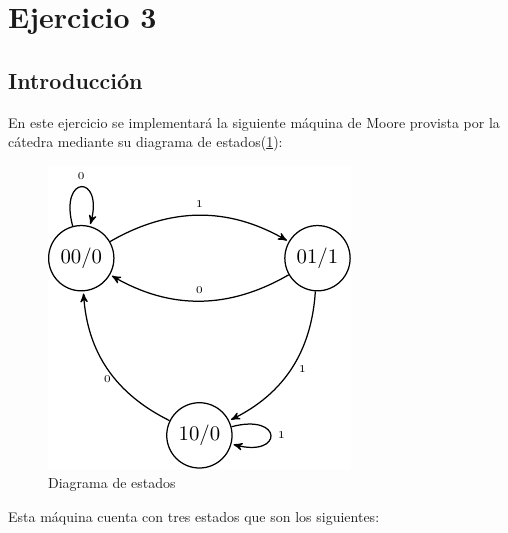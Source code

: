 \section{Ejercicio 3}
\subsection{Introducción}

En este ejercicio se implementará la siguiente máquina de Moore provista por la cátedra mediante su diagrama de estados(\ref{Diagrama_de_estados_Ej3}):

\begin{figure}[H]
\begin{center}
\includegraphics[scale=0.75]{Ejercicio3/Diagramas/TransicionesEj3}
\caption{Diagrama de estados}
\end{center}
\label{Diagrama_de_estados_Ej3}
\end{figure}

Esta máquina cuenta con tres estados que son los siguientes:

\begin{table}[H]
	\begin{center}
	\caption{Estados utilizados}
	\end{center}
	\label{Estados_Ej3}
\end{table}


